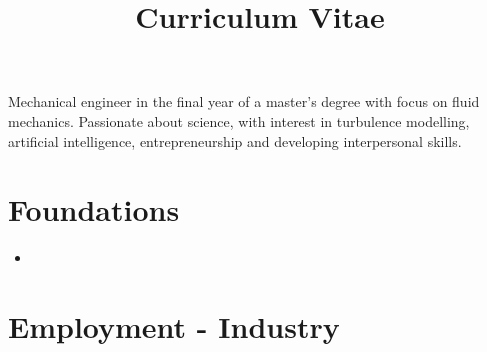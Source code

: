 \documentclass[11pt,a4paper,sans]{moderncv}        %
\title{Curriculum Vitae}                               %
\begin{document}
\makecvtitle


\small{Mechanical engineer in the final year of a master's degree with focus on fluid mechanics. Passionate about science, with interest in turbulence modelling, artificial intelligence, entrepreneurship and developing interpersonal skills.}

\section{Foundations}

\vspace{6pt}

\begin{itemize}
	
\item{}

\end{itemize}

\section{Employment - Industry}

\vspace{6pt}
\end{document}
